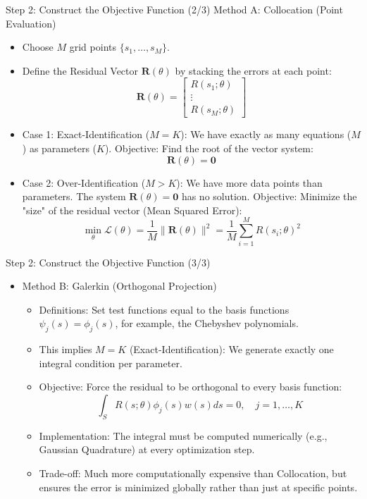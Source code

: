 \documentclass[aspectratio=169]{beamer}
\newcommand{\1}{\mathbf{1}}
\begin{document}
\begin{frame}{Step 2: Construct the Objective Function (2/3)}
    \small
 Method A: Collocation (Point Evaluation)
\begin{itemize}
    \item Choose $M$ grid points $\{s_1, \dots, s_M\}$.
    \item Define the Residual Vector $\mathbf{R}(\theta)$ by stacking the errors at each point:
    $$ \mathbf{R}(\theta) = \begin{bmatrix} R(s_1; \theta) \\ \vdots \\ R(s_M; \theta) \end{bmatrix} $$
    \item Case 1: Exact-Identification ($M = K$): We have exactly as many equations ($M$) as parameters ($K$). Objective: Find the root of the vector system:
    $$ \mathbf{R}(\theta) = \mathbf{0} $$

    \item Case 2: Over-Identification ($M > K$): We have more data points than parameters. The system $\mathbf{R}(\theta) = \mathbf{0}$ has no solution. Objective: Minimize the "size" of the residual vector (Mean Squared Error):
    $$ \min_{\theta} \mathcal{L}(\theta) = \frac{1}{M} \| \mathbf{R}(\theta) \|^2 = \frac{1}{M} \sum_{i=1}^M R(s_i; \theta)^2 $$
    \end{itemize}
\end{frame}

\begin{frame}{Step 2: Construct the Objective Function (3/3)}
    \small
        \begin{itemize}
        \item Method B: Galerkin (Orthogonal Projection)
            \begin{itemize}
                \item Definitions: Set test functions equal to the basis functions $\psi_j(s) = \phi_j(s)$, for example, the Chebyshev polynomials.
                \item This implies $M = K$ (Exact-Identification): We generate exactly one integral condition per parameter.
                \item Objective: Force the residual to be orthogonal to every basis function:
                $$ \int_S R(s; \theta) \phi_j(s) w(s) ds = 0, \quad j=1,\dots,K $$
                \item Implementation: The integral must be computed numerically (e.g., Gaussian Quadrature) at every optimization step. 
                \item Trade-off: Much more computationally expensive than Collocation, but ensures the error is minimized globally rather than just at specific points.
            \end{itemize}
        \end{itemize}
    \end{frame}
\end{document}
